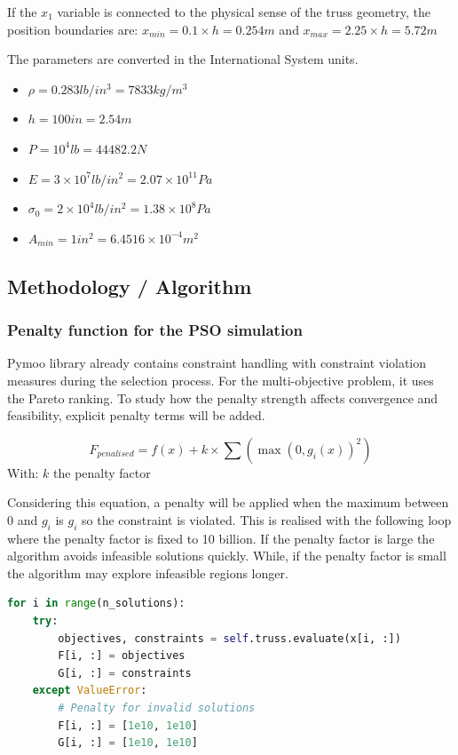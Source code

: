 If the $x_1$ variable is connected to the physical sense of the truss geometry, the position boundaries are:
$x_{min}=0.1 \times h=0.254m$ and $x_{max}=2.25 \times h=5.72m$

The parameters are converted in the International System units.
\begin{itemize}
    \item $\rho=0.283lb/in^3=7833kg/m^3$
    \item $h=100 in = 2.54 m$
    \item $P=10^4lb=44482.2N$
    \item $E=3 \times 10^7lb/in^2=2.07 \times 10^{11}Pa$
    \item $\sigma_0=2 \times 10^4lb/in^2=1.38 \times 10^8Pa$
    \item $A_{min}=1in^2=6.4516 \times 10^{-4}m^2$
\end{itemize}

\subsection{Methodology / Algorithm}

\subsubsection{Penalty function for the PSO simulation}

Pymoo library already contains constraint handling with constraint violation measures during the selection process. For the multi-objective problem, it uses the Pareto ranking. To study how the penalty strength affects convergence and feasibility, explicit penalty terms will be added.

\begin{equation}
F_{penalised}=f(x)+k \times \sum(\max(0,g_i(x))^2)
\end{equation}
With: $k$ the penalty factor

Considering this equation, a penalty will be applied when the maximum between 0 and $g_i$ is $g_i$ so the constraint is violated. This is realised with the following loop where the penalty factor is fixed to 10 billion. If the penalty factor is large the algorithm avoids infeasible solutions quickly. While, if the penalty factor is small the algorithm may explore infeasible regions longer.

\begin{lstlisting}[language=Python]
for i in range(n_solutions):
    try:
        objectives, constraints = self.truss.evaluate(x[i, :])
        F[i, :] = objectives
        G[i, :] = constraints
    except ValueError:
        # Penalty for invalid solutions
        F[i, :] = [1e10, 1e10]
        G[i, :] = [1e10, 1e10]
\end{lstlisting}

